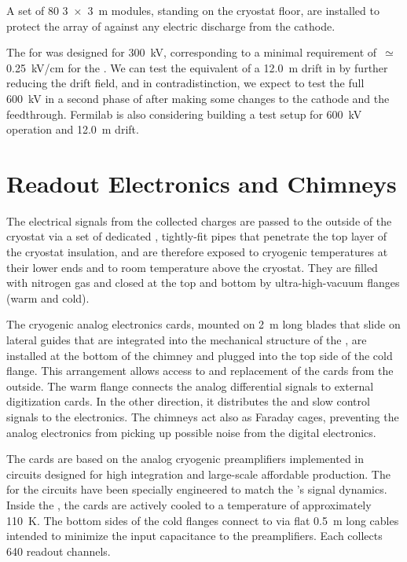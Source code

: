 A set of 80 \SI{3x3}{m}  modules, standing on the cryostat floor, are installed to protect the array of  against any electric discharge from the cathode.

The  for  was designed for \SI{300}{kV}, corresponding to
a minimal requirement of \efield$\,\simeq\,$\SI{0.25}{kV/cm} for the . We can test the equivalent
of a \SI{12.0}{m} drift in  by further reducing the drift field, and in contradistinction, we expect to test the full \SI{600}{kV} in a second phase of  after making some changes to the cathode and the  feedthrough. 
Fermilab is also considering building a test setup for \SI{600}{kV} operation and \SI{12.0}{m} drift. 

\section{Readout Electronics and Chimneys}
\label{sec:dp-execsum-electronics}

The electrical signals from the collected charges are passed to the outside of the cryostat via a set of dedicated , tightly-fit pipes that penetrate the top layer of the cryostat insulation, and are therefore exposed to cryogenic temperatures at their lower ends and to room temperature above the cryostat. They are filled with nitrogen gas and closed at the top and  bottom by ultra-high-vacuum flanges (warm and cold).  

The cryogenic analog  electronics cards, mounted on \SI{2}{m} long blades that slide on lateral guides that are integrated into the mechanical structure of the , are installed at the bottom of the chimney and plugged into the top side of the cold flange. 
This arrangement allows access to and replacement of the cards from the outside. 
 The warm flange connects the analog differential signals to external digitization cards. In the other direction, it distributes the  and slow control signals to the  electronics.  The chimneys act also as Faraday cages, preventing the analog  electronics  from picking up possible noise from the digital electronics.   
 
The  cards are based on the analog cryogenic preamplifiers implemented in   circuits designed for high integration and large-scale affordable production. 
The  for the  circuits have been specially engineered to match the 's signal dynamics. Inside the , the cards are actively cooled to a temperature of approximately \SI{110}{K}.  The bottom sides of the cold flanges connect to   via flat \SI{0.5}{m} long cables intended to minimize the input capacitance to the preamplifiers. Each  collects \num{640} readout channels. 

